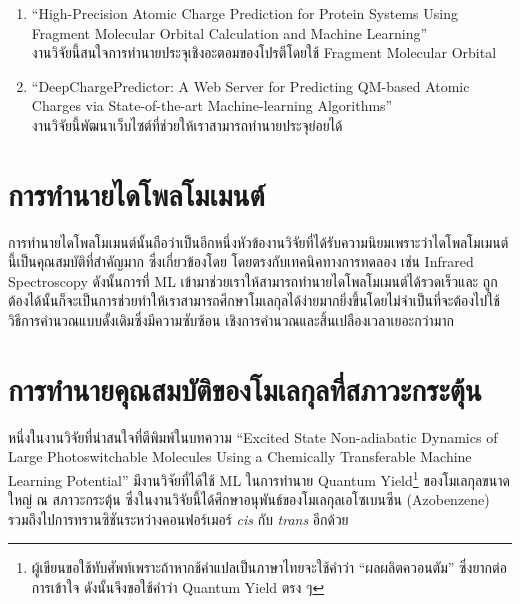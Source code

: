 \begin{enumerate}
    \item \enquote{High-Precision Atomic Charge Prediction for Protein Systems Using Fragment Molecular Orbital 
    Calculation and Machine Learning}\autocite{kato2020} \\ 
    งานวิจัยนี้สนใจการทำนายประจุเชิงอะตอมของโปรตีโดยใช้ Fragment Molecular Orbital
    
    \item \enquote{DeepChargePredictor: A Web Server for Predicting QM-based Atomic Charges via State-of-the-art 
    Machine-learning Algorithms}\autocite{wang2021} \\ 
    งานวิจัยนี้พัฒนาเว็บไซต์ที่ช่วยให้เราสามารถทำนายประจุย่อยได้
\end{enumerate}

\section{การทำนายไดโพลโมเมนต์}
\label{sec:pred_dipole_moment}

การทำนายไดโพลโมเมนต์นั้นถือว่าเป็นอีกหนึ่งหัวข้องานวิจัยที่ได้รับความนิยมเพราะว่าไดโพลโมเมนต์นี้เป็นคุณสมบัติที่สำคัญมาก ซึ่งเกี่ยวข้องโดย%
โดยตรงกับเทคนิคทางการทดลอง เช่น Infrared Spectroscopy ดังนั้นการที่ ML เข้ามาช่วยเราให้สามารถทำนายไดโพลโมเมนต์ได้รวดเร็วและ%
ถูกต้องได้นั้นก็จะเป็นการช่วยทำให้เราสามารถศึกษาโมเลกุลได้ง่ายมากยิ่งขึ้นโดยไม่จำเป็นที่จะต้องไปใช้วิธีการคำนวณแบบดั้งเดิมซึ่งมีความซับซ้อน%
เชิงการคำนวณและสิ้นเปลืองเวลาเยอะกว่ามาก\autocite{knijff2021,liu2020,pereira2018,staacke2022,sun2022,veit2020,vo2019}

\section{การทำนายคุณสมบัติของโมเลกุลที่สภาวะกระตุ้น}
\label{sec:pred_ex_prop}

หนึ่งในงานวิจัยที่น่าสนใจที่ตีพิมพ์ในบทความ \enquote{Excited State Non-adiabatic Dynamics of Large Photoswitchable Molecules 
Using a Chemically Transferable Machine Learning Potential}\autocite{axelrod2022} มีงานวิจัยที่ได้ใช้ ML ในการทำนาย 
Quantum Yield\footnote{ผู้เขียนขอใช้ทับศัพท์เพราะถ้าหากช้คำแปลเป็นภาษาไทยจะใช้คำว่า \enquote{ผลผลิตควอนตัม} ซึ่งยากต่อการเข้าใจ 
ดังนั้นจึงขอใช้คำว่า Quantum Yield ตรง ๆ} ของโมเลกุลขนาดใหญ่ ณ สภาวะกระตุ้น ซึ่งในงานวิจัยนี้ได้ศึกษาอนุพันธ์ของโมเลกุลเอโซเบนซีน 
(Azobenzene) รวมถึงไปการทรานซิชันระหว่างคอนฟอร์เมอร์ \textit{cis} กับ \textit{trans} อีกด้วย

